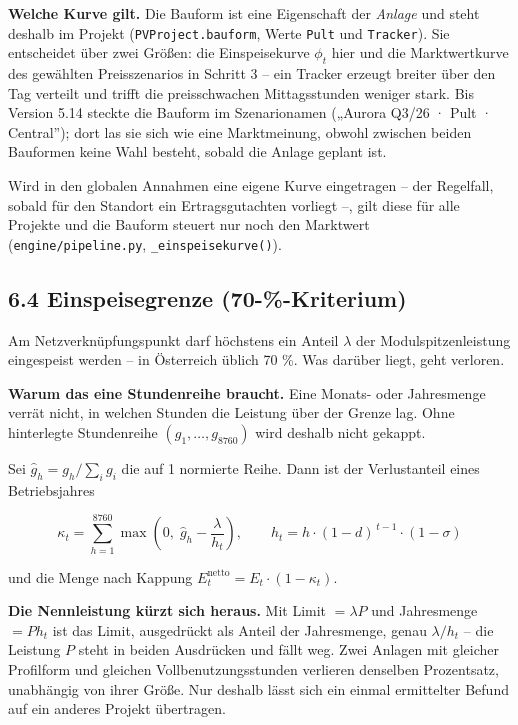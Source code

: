 \documentclass[
  a4paper,
  10pt]{article}
\begin{document}
\textbf{Welche Kurve gilt.} Die Bauform ist eine Eigenschaft der
\emph{Anlage} und steht deshalb im Projekt (\texttt{PVProject.bauform},
Werte \texttt{Pult} und \texttt{Tracker}). Sie entscheidet über zwei
Größen: die Einspeisekurve \(\phi_t\) hier und die Marktwertkurve des
gewählten Preisszenarios in Schritt 3 -- ein Tracker erzeugt breiter
über den Tag verteilt und trifft die preisschwachen Mittagsstunden
weniger stark. Bis Version 5.14 steckte die Bauform im Szenarionamen
(„Aurora Q3/26 · Pult · Central''); dort las sie sich wie eine
Marktmeinung, obwohl zwischen beiden Bauformen keine Wahl besteht,
sobald die Anlage geplant ist.

Wird in den globalen Annahmen eine eigene Kurve eingetragen -- der
Regelfall, sobald für den Standort ein Ertragsgutachten vorliegt --,
gilt diese für alle Projekte und die Bauform steuert nur noch den
Marktwert (\nolinkurl{engine/pipeline.py}, \texttt{\_einspeisekurve()}).

\hypertarget{einspeisegrenze-70--kriterium}{%
\subsection{6.4 Einspeisegrenze
(70-\%-Kriterium)}\label{einspeisegrenze-70--kriterium}}

Am Netzverknüpfungspunkt darf höchstens ein Anteil \(\lambda\) der
Modulspitzenleistung eingespeist werden -- in Österreich üblich 70 \%.
Was darüber liegt, geht verloren.

\textbf{Warum das eine Stundenreihe braucht.} Eine Monats- oder
Jahresmenge verrät nicht, in welchen Stunden die Leistung über der
Grenze lag. Ohne hinterlegte Stundenreihe \((g_1,\dots,g_{8760})\) wird
deshalb nicht gekappt.

Sei \(\hat g_h = g_h / \sum_i g_i\) die auf 1 normierte Reihe. Dann ist
der Verlustanteil eines Betriebsjahres

\[ \kappa_t = \sum_{h=1}^{8760} \max\!\left(0,\; \hat g_h - \frac{\lambda}{h_t}\right), \qquad h_t = h \cdot (1-d)^{\,t-1} \cdot (1-\sigma) \]

und die Menge nach Kappung
\(E_t^{\mathrm{netto}} = E_t \cdot (1 - \kappa_t)\).

\textbf{Die Nennleistung kürzt sich heraus.} Mit Limit \(= \lambda P\)
und Jahresmenge \(= P h_t\) ist das Limit, ausgedrückt als Anteil der
Jahresmenge, genau \(\lambda / h_t\) -- die Leistung \(P\) steht in
beiden Ausdrücken und fällt weg. Zwei Anlagen mit gleicher Profilform
und gleichen Vollbenutzungsstunden verlieren denselben Prozentsatz,
unabhängig von ihrer Größe. Nur deshalb lässt sich ein einmal
ermittelter Befund auf ein anderes Projekt übertragen.
\end{document}

